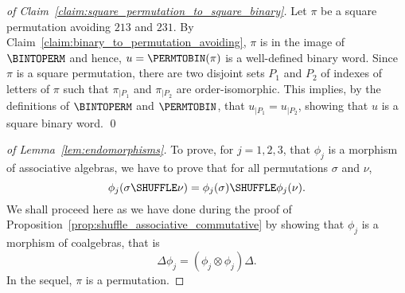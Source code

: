 \begin{proof}[of Claim~\ref{claim:square_permutation_to_square_binary}]
    Let $\pi$ be a square permutation avoiding $213$ and $231$. By
    Claim~\ref{claim:binary_to_permutation_avoiding}, $\pi$ is in
    the image of $\BINTOPERM$ and hence, $u = \PERMTOBIN(\pi)$ is a
    well-defined binary word. Since $\pi$ is a square permutation,
    there are two disjoint sets $P_1$ and $P_2$ of indexes of letters
    of $\pi$ such that $\pi_{|P_1}$ and $\pi_{|P_2}$ are
    order-isomorphic. This implies, by the definitions of $\BINTOPERM$
    and $\PERMTOBIN$, that $u_{|P_1} = u_{|P_2}$, showing that $u$
    is a square binary word.
    \qed
\end{proof}
\bigskip

\begin{proof}[of Lemma~\ref{lem:endomorphisms}]
    To prove, for $j = 1, 2, 3$, that $\phi_j$ is a morphism of
    associative algebras, we have to prove that for all permutations
    $\sigma$ and $\nu$,
    \begin{equation}
        \phi_j(\sigma \SHUFFLE \nu) =
        \phi_j(\sigma) \SHUFFLE \phi_j(\nu).
    \end{equation}
    We shall proceed here as we have done during the proof of
    Proposition~\ref{prop:shuffle_associative_commutative} by showing
    that $\phi_j$ is a morphism of coalgebras, that is
    \begin{equation}
        \Delta \phi_j = (\phi_j \otimes \phi_j) \Delta.
    \end{equation}
    In the sequel, $\pi$ is a permutation.
    \smallskip


\end{proof}
